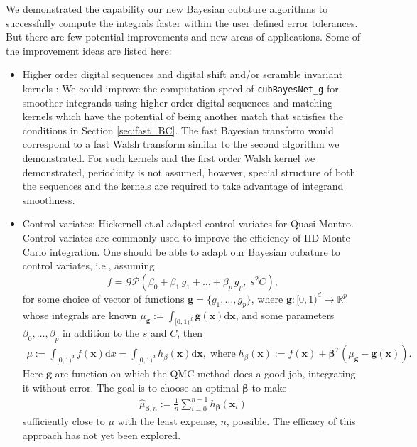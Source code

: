 \documentclass{iitthesis}          %
\newcommand{\bm}[1]{\boldsymbol{#1}}
\newcommand{\dif}[1]{\text{d}{#1}}
\newcommand{\reals}{\mathbb{R}}
\newcommand{\vbeta}{{\bm{\beta}}}
\newcommand{\vg}{\bm{g}}
\newcommand{\vx}{\bm{x}}
\newcommand{\dx}{\dif{{x}}}
\newcommand{\dvx}{\dif{\bm{x}}}
\newcommand{\code}[1]{\texttt{#1}}
\begin{document}
{{{{{{

We demonstrated the capability our new Bayesian cubature algorithms to successfully compute the integrals faster within the user defined error tolerances. But there are few potential improvements and new areas of applications.
Some of the improvement ideas are listed here:
\begin{itemize}
\item Higher order digital sequences and digital shift and/or scramble invariant kernels \cite{Nuyens2013} \cite{Bald12a}:
We could improve the computation speed of \code{cubBayesNet\_g} for smoother integrands using higher order digital sequences and matching kernels which have the potential of being another match that satisfies the conditions in Section \ref{sec:fast_BC}.  The fast Bayesian transform would correspond to a fast Walsh transform similar to the second algorithm we demonstrated.  For such kernels and the first order Walsh kernel we demonstrated, periodicity is not assumed, however, special structure of both the sequences and the kernels are required to take advantage of integrand smoothness.

\item Control variates:
Hickernell et.al \cite{HicEtal17a} \cite{Li16a} adapted control variates for Quasi-Montro. 
Control variates are commonly used to improve the efficiency of IID Monte Carlo integration.
One should be able to adapt our Bayesian cubature to control variates, i.e., assuming  
\begin{equation*}
f = \mathcal{GP} \left( \beta_0 + \beta_1 \, g_1 + \dots + \beta_p \, g_p, \;s^2 C \right),
\end{equation*}
for some choice of vector of functions $\vg = \{g_1, \ldots, g_p\}$, where $\vg : [0,1)^d \to \reals^p$ whose integrals are known $\mu_{\vg} := \int_{[0,1)^d} \vg(\vx)\dvx$, and some parameters $\beta_0, \ldots, \beta_p$ in addition to the $s$ and $C$, then
\begin{align*}
\mu :=
\int_{[0,1)^d} f(\vx) \dx =
\int_{[0,1)^d} h_{\beta} (\vx) \dvx,  \; \text{where} \;
h_{\beta}(\vx) := f(\vx) + \vbeta^T
(\mu_{\vg} - \vg(\vx)).
\end{align*}
Here $\vg$ are function on which the QMC method does a good job, integrating it without error. 
The goal is to choose an optimal $\vbeta$ to make
\begin{align*}
\widehat{\mu}_{\vbeta,n} :=
\frac 1n \sum_{i=0}^{n-1} h_{\vbeta} (\vx_i)
\end{align*}
sufficiently close to $\mu$ with the least expense, $n$, possible.
The efficacy of this approach has not yet been explored.











\end{itemize}}}}}}}
\end{document}
